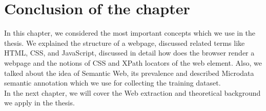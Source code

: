 \section*{Conclusion of the chapter}
In this chapter, we considered the most important concepts which we use in the thesis. We explained the structure of a webpage, discussed related terms like HTML, CSS, and JavaScript, discussed in detail how does the browser render a webpage and the notions of CSS and XPath locators of the web element. Also, we talked about the idea of Semantic Web, its prevalence and described Microdata semantic annotation which we use for collecting the training dataset.\\

In the next chapter, we will cover the Web extraction and theoretical background we apply in the thesis. 